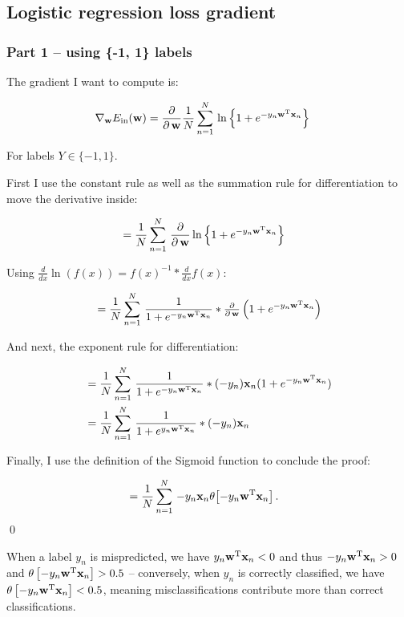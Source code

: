 
\newpage 
\subsection{Logistic regression loss gradient}

\subsubsection{Part 1 -- using \{-1, 1\} labels}

The gradient I want to compute is:

\begin{align*}
  \nabla_{\mathbf{w}} E_\text{in}(\mathbf{w}) &= \frac{\partial}{\partial \, \mathbf{w}} \frac{1}{N}\sum_{n = 1}^N\, \ln \left\{1 + e^{-y_n \mathbf{w}^{\text{T}} \mathbf{x}_n}\right\}
\end{align*}

\noindent For labels $Y \in \{-1, 1\}$.

First I use the constant rule as well as the summation rule for differentiation
to move the derivative inside:

\begin{align*}
  &= \frac{1}{N}\sum_{n = 1}^N\, \frac{\partial}{\partial \, \mathbf{w}} \ln \left\{1 + e^{-y_n \mathbf{w}^{\text{T}} \mathbf{x}_n}\right\}
\end{align*}

\noindent Using $\tfrac{d}{dx}\ln (f(x)) = f(x)^{-1} * \tfrac{d}{dx} f(x)$:

\begin{align*}
  &= \frac{1}{N}\sum_{n = 1}^N\, \frac{1}{1 + e^{-y_n \mathbf{w}^{\text{T}} \mathbf{x}_n}} * \tfrac{\partial}{\partial \, \mathbf{w}}\left(1 + e^{-y_n \mathbf{w}^{\text{T}} \mathbf{x}_n}\right)\\
\end{align*}

\noindent And next, the exponent rule for differentiation:

\begin{align*}
  &= \frac{1}{N}\sum_{n = 1}^N\, \frac{1}{1 + e^{-y_n \mathbf{w}^{\text{T}} \mathbf{x}_n}} * (- y_n) \mathbf{x}_n (1 + e^{-y_n \mathbf{w}^{\text{T}} \mathbf{x}_n})\\
  &= \frac{1}{N}\sum_{n = 1}^N\, \frac{1}{1 + e^{y_n \mathbf{w}^{\text{T}} \mathbf{x}_n}} * (- y_n) \mathbf{x}_n
\end{align*}

\noindent Finally, I use the definition of the Sigmoid function to conclude the
proof:

\begin{align*}
  &= \frac{1}{N}\sum_{n = 1}^N\, - y_n \mathbf{x}_n \theta\!\left[-y_n \mathbf{w}^{\text{T}}\mathbf{x}_n\right].
\end{align*}
\qed

When a label $y_n$ is mispredicted, we have $y_n \mathbf{w}^{\text{T}} \mathbf{x}_n < 0$ and thus $-y_n \mathbf{w}^{\text{T}} \mathbf{x}_n > 0$ and
$\theta\left[-y_n \mathbf{w}^{\text{T}} \mathbf{x}_n\right] > 0.5$ -- conversely, when $y_n$ is correctly
classified, we have $\theta\left[-y_n \mathbf{w}^{\text{T}} \mathbf{x}_n\right] < 0.5$, meaning misclassifications
contribute more than correct classifications.

